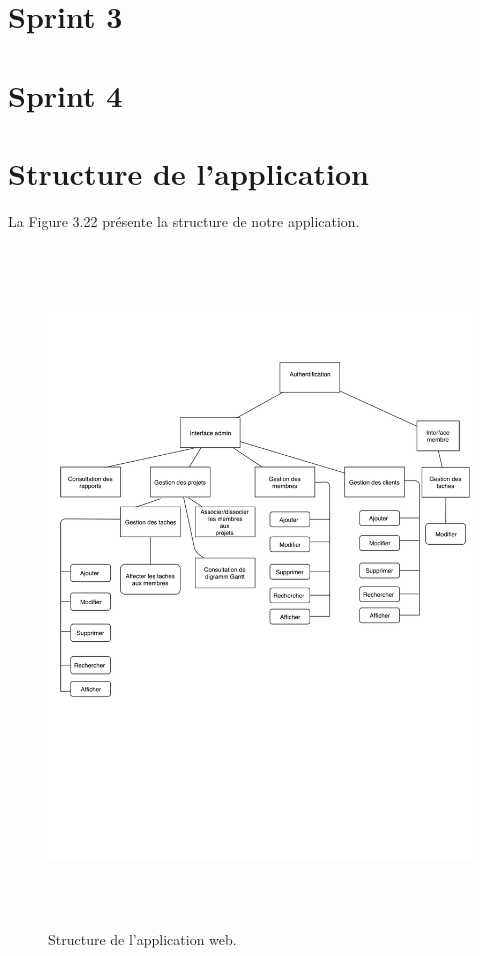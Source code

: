 \newpage
\section{ Sprint 3 }


\section{ Sprint 4 }


\section{Structure de l'application}
La Figure 3.22 pr\'{e}sente la structure de notre application.

\begin{figure}[H]
\center
\includegraphics[width=14cm,height=18cm]{./figures/structure.png}
\caption{Structure de l'application web.}
\end{figure}


